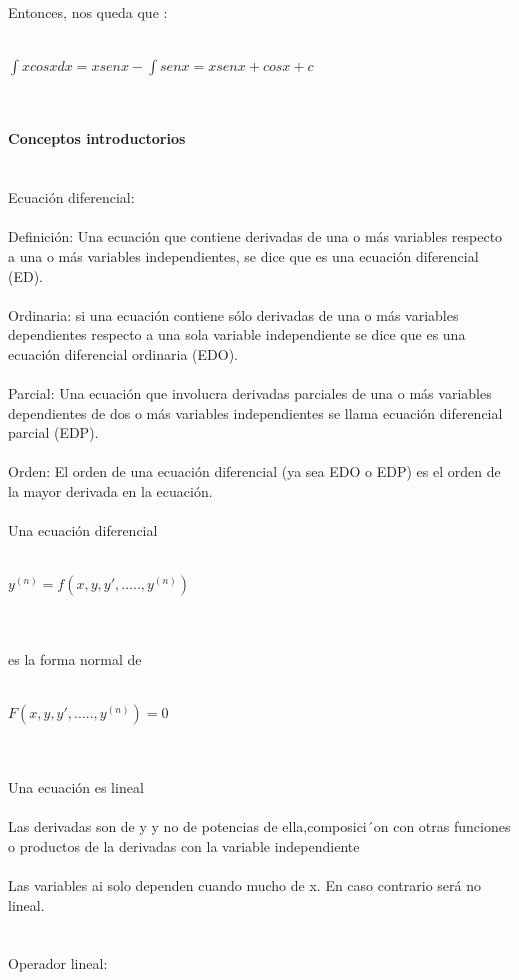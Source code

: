 \documentclass[a4paper,10pt]{article}
\begin{document}
Entonces, nos queda que :\\\\
\centerline{$\int xcosx dx = xsenx - \int senx = xsenx + cosx + c$}\\\\
\newpage
\textbf{Conceptos introductorios}\\\\\\
Ecuación diferencial:\\\\
Definición: Una ecuación que contiene derivadas de una o más variables respecto a una o más variables independientes, se dice que es una ecuación diferencial (ED).\\\\
Ordinaria: si una ecuación contiene sólo derivadas de una o más variables dependientes respecto a una sola variable independiente se dice que es una ecuación diferencial ordinaria (EDO).\\\\
Parcial: Una ecuación que involucra derivadas parciales de una o más variables dependientes de dos o más variables independientes se llama ecuación diferencial parcial (EDP).\\\\
Orden: El orden de una ecuación diferencial (ya sea EDO o EDP) es el orden de la mayor derivada en la ecuación.\\\\
Una ecuación diferencial\\\\
\centerline{$y^{(n)} = f(x,y,y',....., y^{(n)}) $}\\\\
es la forma normal de\\\\
\centerline{$F(x,y,y',.....,y^{(n)})=0$}\\\\
Una ecuación es lineal\\\\
Las derivadas son de y y no de potencias de ella,composici´on
con otras funciones o productos de la derivadas con la variable
independiente\\\\
Las variables ai solo dependen cuando mucho de x.
En caso contrario será no lineal.\\\\\\
Operador lineal:\\\\
\end{document}
